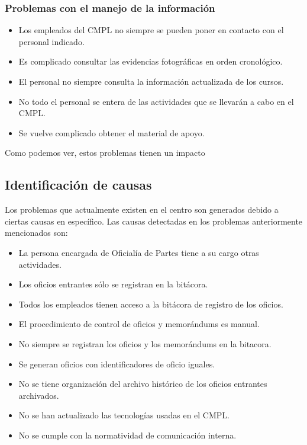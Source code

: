 		\subsubsection{Problemas con el manejo de la información}
\begin{itemize}
	
	\item Los empleados del CMPL no siempre se pueden poner en contacto con el personal indicado.
	\item Es complicado consultar las evidencias fotográficas en orden cronológico.
	\item El personal no siempre consulta la información actualizada de los cursos.
	\item No todo el personal se entera de las actividades que se llevarán a cabo en el CMPL.
	\item Se vuelve complicado obtener el material de apoyo.	
	
\end{itemize}

Como podemos ver, estos problemas tienen un impacto
	\subsection{Identificación de causas}
	Los problemas que actualmente existen en el centro son generados debido a ciertas causas en específico. Las causas detectadas en los problemas anteriormente mencionados son:

\begin{itemize}
	
	\item La persona encargada de Oficialía de Partes tiene a su cargo otras actividades.
	\item Los oficios entrantes sólo se registran en la bitácora.
	\item Todos los empleados tienen acceso a la bitácora de registro de los oficios.
	\item El procedimiento de control de oficios y memorándums es manual.
	\item No siempre se registran los oficios y los memorándums en la bitacora.
	\item Se generan oficios con identificadores de oficio iguales.
	\item No se tiene organización del archivo histórico de los oficios entrantes archivados.
	\item No se han actualizado las tecnologías usadas en el CMPL.
	\item No se cumple con la normatividad de comunicación interna.
	
\end{itemize}
